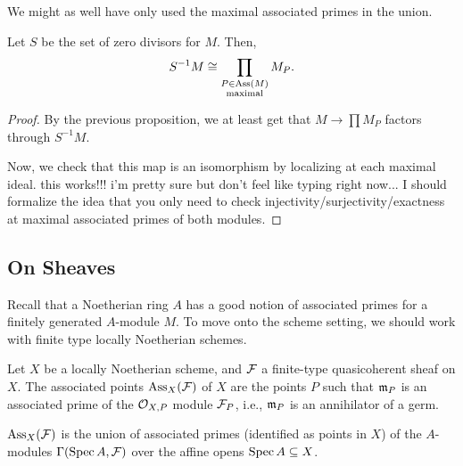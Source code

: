 \documentclass[12pt]{article}
\begin{document}
\begin{rmk}
    We might as well have only used the maximal associated primes in the union.
\end{rmk}

\begin{prop}
    Let $S$ be the set of zero divisors for $M$. Then,
    \[S^{-1}M \cong \prod_{\substack{P\in \operatorname{Ass}(M)\\ \text{maximal}}} M_P.\]
\end{prop}
\begin{proof}
    By the previous proposition, we at least get that $M\to \prod M_P$ factors through $S^{-1}M$.
    
    Now, we check that this map is an isomorphism by localizing at each maximal ideal. {\color{red} this works!!! i'm pretty sure but don't feel like typing right now... I should formalize the idea that you only need to check injectivity/surjectivity/exactness at maximal associated primes of both modules.}
\end{proof}

\subsection{On Sheaves}

Recall that a Noetherian ring $A$ has a good notion of associated primes for a finitely generated $A$-module $M$. To move onto the scheme setting, we should work with finite type locally Noetherian schemes.

\begin{defn}
    Let $X$ be a locally Noetherian scheme, and $\mathcal{F}$ a finite-type quasicoherent sheaf on $X$. The associated points $\operatorname{Ass}_X(\mathcal{F})$ of $X$ are the points $P$ such that $\mathfrak{m}_P$ is an associated prime of the $\mathcal{O}_{X,P}$ module $\mathcal{F}_P$, i.e., $\mathfrak{m}_P$ is an annihilator of a germ.
\end{defn}

\begin{prop}
     $\operatorname{Ass}_X(\mathcal{F})$ is the union of associated primes (identified as points in $X$) of the $A$-modules $\Gamma(\operatorname{Spec} A, \mathcal{F})$ over the affine opens $\operatorname{Spec} A\subseteq X$.
\end{prop}
\end{document}
